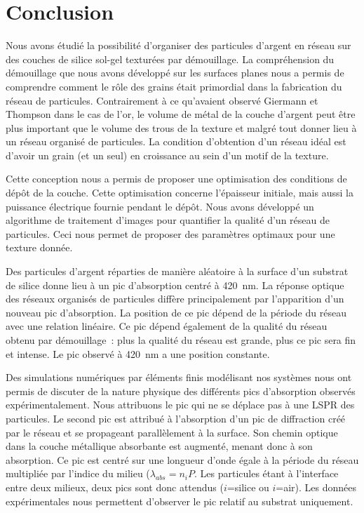 \section{Conclusion}
Nous avons étudié la possibilité d'organiser des particules d'argent en réseau sur des couches de silice sol-gel texturées par démouillage. La compréhension du démouillage que nous avons développé sur les surfaces planes nous a permis de comprendre comment le rôle des grains était primordial dans la fabrication du réseau de particules. Contrairement à ce qu'avaient observé Giermann et Thompson dans le cas de l'or, le volume de métal de la couche d'argent peut être plus important que le volume des trous de la texture et malgré tout donner lieu à un réseau organisé de particules. La condition d'obtention d'un réseau idéal est d'avoir un grain (et un seul) en croissance au sein d'un motif de la texture. \par 
Cette conception nous a permis de proposer une optimisation des conditions de dépôt de la couche. Cette optimisation concerne l'épaisseur initiale, mais aussi la puissance électrique fournie pendant le dépôt. Nous avons développé un algorithme de traitement d'images pour quantifier la qualité d'un réseau de particules. Ceci nous permet de proposer des paramètres optimaux pour une texture donnée.\par 
Des particules d'argent réparties de manière aléatoire à la surface d'un substrat de silice donne lieu à un pic d'absorption centré à 420~nm. La réponse optique des réseaux organisés de particules diffère principalement par l'apparition d'un nouveau pic d'absorption. La position de ce pic dépend de la période du réseau avec une relation linéaire. Ce pic dépend également de la qualité du réseau obtenu par démouillage~: plus la qualité du réseau est grande, plus ce pic sera fin et intense. Le pic observé à 420~nm a une position constante.\par 
Des simulations numériques par éléments finis modélisant nos systèmes nous ont permis de discuter de la nature physique des différents pics d'absorption observés expérimentalement. Nous attribuons le pic qui ne se déplace pas à une LSPR des particules. Le second pic est attribué à l'absorption d'un pic de diffraction créé par le réseau et se propageant parallèlement à la surface. Son chemin optique dans la couche métallique absorbante est augmenté, menant donc à son absorption. Ce pic est centré sur une longueur d'onde égale à la période du réseau multipliée par l'indice du milieu ($\lambda_{abs}=n_{i}P$. Les particules étant à l'interface entre deux milieux, deux pics sont donc attendus ($i$=silice ou $i$=air). Les données expérimentales nous permettent d'observer le pic relatif au substrat uniquement.\par \vspace{12pt}

